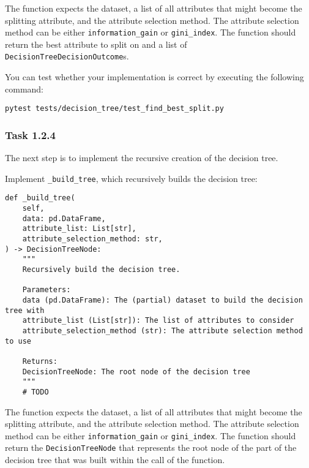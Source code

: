 \documentclass[
english,
smallborders
]{i6prcsht}
\begin{document}
\vspace*{0.1cm}

The function expects the dataset, a list of all attributes that might become the splitting attribute, and the attribute selection method. The attribute selection method can be either \texttt{information\_gain} or \texttt{gini\_index}. The function should return the best attribute to split on and a list of \texttt{DecisionTreeDecisionOutcome}s.

You can test whether your implementation is correct by executing the following command:

\vspace*{0.3cm}

\begin{lstlisting}
pytest tests/decision_tree/test_find_best_split.py
\end{lstlisting}

\vspace*{0.1cm}

\subsubsection*{Task 1.2.4}

The next step is to implement the recursive creation of the decision tree.

Implement \texttt{\_build\_tree}, which recursively builds the decision tree:

\vspace*{0.3cm}

\begin{lstlisting}
def _build_tree(
	self,
	data: pd.DataFrame,
	attribute_list: List[str],
	attribute_selection_method: str,
) -> DecisionTreeNode:
    """
    Recursively build the decision tree.

	Parameters:
	data (pd.DataFrame): The (partial) dataset to build the decision tree with
	attribute_list (List[str]): The list of attributes to consider
	attribute_selection_method (str): The attribute selection method to use

	Returns:
	DecisionTreeNode: The root node of the decision tree
	"""
	# TODO
\end{lstlisting}

\vspace*{0.1cm}

The function expects the dataset, a list of all attributes that might become the splitting attribute, and the attribute selection method. The attribute selection method can be either \texttt{information\_gain} or \texttt{gini\_index}. The function should return the \texttt{DecisionTreeNode} that represents the root node of the part of the decision tree that was built within the call of the function.
\end{document}
